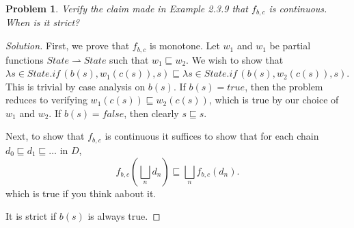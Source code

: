 \documentclass{article}
\newtheorem{problem}{Problem}[section]}
\newcommand{\pf}{\rightharpoonup}
\begin{document}
\begin{problem}
    Verify the claim made in Example 2.3.9 that $f_{b,c}$ is continuous. When is
    it strict?
\end{problem}
\begin{proof}[Solution]
    First, we prove that $f_{b,c}$ is monotone. Let $w_1$ and $w_1$ be partial
    functions $State\pf State$ such that $w_1\sqsubseteq w_2$. We wish to show
    that $\lambda s\in State.\textit{if}\,(b(s), w_1(c(s)), s)\sqsubseteq\lambda
    s\in State.\textit{if}\,(b(s),w_2(c(s)), s)$. This is trivial by case
    analysis on $b(s)$. If $b(s)=true$, then the problem reduces to verifying
    $w_1(c(s))\sqsubseteq w_2(c(s))$, which is true by our choice of $w_1$ and
    $w_2$. If $b(s)=false$, then clearly $s\sqsubseteq s$.

    Next, to show that $f_{b,c}$ is continuous it suffices to show that for each
    chain $d_0\sqsubseteq d_1\sqsubseteq\dots$ in $D$,
    \[
        f_{b,c}\left(\bigsqcup_n d_n\right)\sqsubseteq\bigsqcup_n f_{b,c}(d_n).
    \]
    which is true if you think aabout it.

    It is strict if $b(s)$ is always true.
\end{proof}
\end{document}
